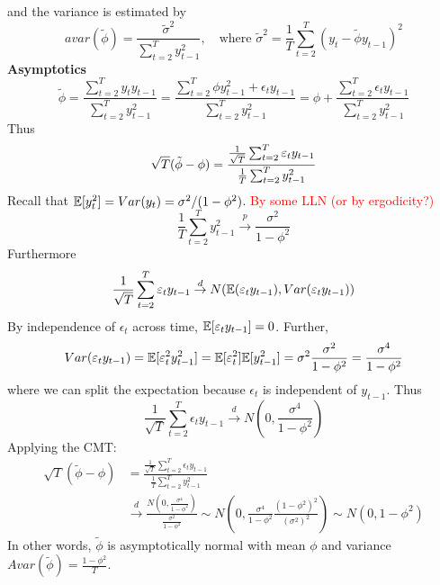 \documentclass[DIV=14,titlepage=false]{scrreprt}
\begin{document}
and the variance is estimated by 
\[
    avar(\tilde \phi) = \frac{\tilde \sigma^2}{\sum_{t=2}^{T} y_{t-1}^2}, \quad \text{where } \tilde \sigma^2 = \frac{1}{T} \sum_{t=2}^{T} (y_t - \tilde \phi y_{t-1})^2
\]
\textbf{Asymptotics}\\
\[
    \tilde \phi = \frac{\sum_{t=2}^{T} y_t y_{t-1}}{\sum_{t=2}^{T} y_{t-1}^2} = \frac{\sum_{t=2}^{T} \phi y_{t-1}^2 + \epsilon_t y_{t-1}}{\sum_{t=2}^{T} y_{t-1}^2} = \phi + \frac{\sum_{t=2}^{T} \epsilon_t y_{t-1}}{\sum_{t=2}^{T} y_{t-1}^2}
\]
Thus 
\[
    \sqrt{T}(\tilde \phi - \phi) = \frac{\frac{1}{\sqrt{T}}\sum_{t=2}^{T} \epsilon_t y_{t-1}}{\frac{1}{T} \sum_{t=2}^{T} y_{t-1}^2} \\
\]
Recall that $\E[y_t^2] = Var(y_t) = \sigma^2/(1-\phi^2)$. \textcolor{red}{By some LLN (or by ergodicity?)}
\[
    \frac{1}{T} \sum_{t=2}^{T} y_{t-1}^2 \overset{p}{\to} \frac{\sigma^2}{1-\phi^2}
\]
Furthermore
\[ 
\frac{1}{\sqrt{T}}\sum_{t=2}^{T} \epsilon_t y_{t-1} \overset{d}{\to} N(\E(\epsilon_t y_{t-1}), Var(\epsilon_t y_{t-1})) 
\]
By independence of $\epsilon_t$ across time, $\E[\epsilon_t y_{t-1}] = 0$. Further,
\[
    Var(\epsilon_t y_{t-1}) = \E[\epsilon_t^2 y_{t-1}^2] = \E[\epsilon_t^2] \E[y_{t-1}^2] = \sigma^2 \frac{\sigma^2}{1-\phi^2} = \frac{\sigma^4}{1-\phi^2}
\]
where we can split the expectation because $\epsilon_t$ is independent of $y_{t-1}$. Thus
\[
    \frac{1}{\sqrt{T}}\sum_{t=2}^{T} \epsilon_t y_{t-1} \overset{d}{\to} N(0, \frac{\sigma^4}{1-\phi^2})
\]
Applying the CMT:
\begin{align*}
    \sqrt{T}(\tilde \phi - \phi) &= \frac{\frac{1}{\sqrt{T}}\sum_{t=2}^{T} \epsilon_t y_{t-1}}{\frac{1}{T} \sum_{t=2}^{T} y_{t-1}^2} \\
    &\overset{d}{\to} \frac{N(0, \frac{\sigma^4}{1-\phi^2})}{\frac{\sigma^2}{1-\phi^2}}
    \sim N\left(0, \frac{\sigma^4}{1-\phi^2} \frac{(1-\phi^2)^2}{(\sigma^2)^2}\right)
    \sim N(0, 1-\phi^2)
\end{align*}
In other words, $\tilde \phi$ is asymptotically normal with mean $\phi$ and variance $Avar(\tilde \phi)  = \frac{1-\phi^2}{T}$.
\end{document}

